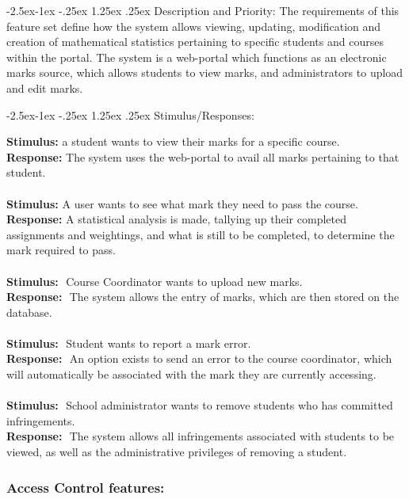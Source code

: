 \documentclass[paper=a4, fontsize=11pt]{scrartcl}
\makeatletter
\numberwithin{equation}{section}		%
\numberwithin{figure}{section}			%
\numberwithin{table}{section}				%
\renewcommand\paragraph{\@startsection{paragraph}{4}{\z@}%
            {-2.5ex\@plus -1ex \@minus -.25ex}%
            {1.25ex \@plus .25ex}%
            {\normalfont\normalsize\bfseries}}
\makeatother
\begin{document}
\paragraph{Description and Priority:}
The requirements of this feature set define how the system allows viewing, updating,
modification and creation of mathematical statistics pertaining to specific students and
courses within the portal. The system is a web-portal which functions as an electronic marks
source, which allows students to view marks, and administrators to upload and edit marks.

\paragraph{Stimulus/Responses:}

\textbf{Stimulus:}​ a student wants to view their marks for a specific course.\\
\textbf{Response:}​ The system uses the web-portal to avail all marks pertaining to that student.\\\\
\textbf{Stimulus:}​ A user wants to see what mark they need to pass the course.\\
\textbf{Response:}​ A statistical analysis is made, tallying up their completed assignments and
weightings, and what is still to be completed, to determine the mark required to pass.\\ \\
\textbf{Stimulus:} ​ Course Coordinator wants to upload new marks.\\
\textbf{Response:} ​ The system allows the entry of marks, which are then stored on the database.\\ \\
\textbf{Stimulus:} ​ Student wants to report a mark error.\\
\textbf{Response:} ​ An option exists to send an error to the course coordinator, which will
automatically be associated with the mark they are currently accessing. \\ \\
\textbf{Stimulus:} ​ School administrator wants to remove students who has committed infringements.\\
\textbf{Response:}  ​ The system allows all infringements associated with students to be viewed, as
well as the administrative privileges of removing a student.

\subsubsection{Access Control features:}
\end{document}
